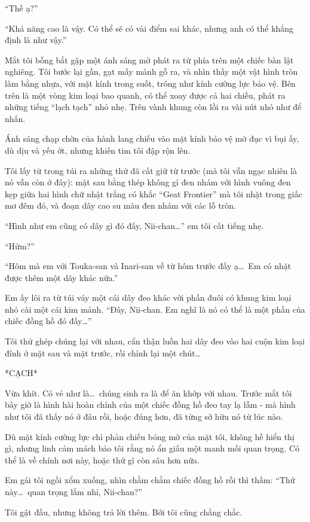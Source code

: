 \documentclass[../main.tex]{subfiles}
\begin{document}
``Thế ạ?''

``Khả năng cao là vậy. Có thể sẽ có vài điểm sai khác, nhưng anh có thể khẳng định là như vậy.''

Mắt tôi bỗng bắt gặp một ánh sáng mờ phát ra từ phía trên một chiếc bàn lật nghiêng. Tôi bước lại gần, gạt mấy mảnh gỗ ra, và nhìn thấy một vật hình tròn làm bằng nhựa, với mặt kính trong suốt, trông như kính cường lực bảo vệ. Bên trên là một vòng kim loại bao quanh, có thể xoay được cả hai chiều, phát ra những tiếng  ``lạch tạch'' nhỏ nhẹ. Trên vành khung còn lồi ra vài nút nhỏ như để nhấn.

Ánh sáng chạp chờn của hành lang chiếu vào mặt kính bảo vệ mờ đục vì bụi ấy, dù dịu và yếu ớt, nhưng khiến tim tôi đập rộn lên.

Tôi lấy từ trong túi ra những thứ đã cất giữ từ trước (mà tôi vẫn ngạc nhiên là nó vẫn còn ở đây): mặt sau bằng thép không gỉ đen nhám với hình vuông đen kẹp giữa hai hình chữ nhật trắng có khắc ``Geat Frontier'' mà tôi nhặt trong giấc mơ đêm đó, và đoạn dây cao su màu đen nhám với các lỗ tròn.

``Hình như em cũng có dây gì đó đấy, Nii-chan\dots'' em tôi cất tiếng nhẹ.

``Hửm?''

``Hôm mà em với Touka-san và Inari-san về từ hôm trước đấy ạ\dots\ Em có nhặt được thêm một dây khác nữa.''

Em ấy lôi ra từ túi váy một cái dây đeo khác với phần đuôi có khung kim loại nhỏ cài một cái kim mảnh. ``Đây, Nii-chan. Em nghĩ là nó có thể là một phần của chiếc đồng hồ đó đấy\dots''

Tôi thử ghép chúng lại với nhau, cẩn thận luồn hai dây đeo vào hai cuộn kim loại đính ở mặt sau và mặt trước, rồi chỉnh lại một chút\dots

*CẠCH*

Vừa khít. Có vẻ như là\dots\ chúng sinh ra là để ăn khớp với nhau. Trước mắt tôi bây giờ là hình hài hoàn chỉnh của một chiếc đồng hồ đeo tay lạ lẫm - mà hình như tôi đã thấy nó ở đâu rồi, hoặc đúng hơn, đã từng sở hữu nó từ lúc nào.

Dù mặt kính cường lực chỉ phản chiếu bóng mờ của mặt tôi, không hề hiển thị gì, nhưng linh cảm mách bảo tôi rằng nó ẩn giấu một manh mối quan trọng. Có thể là về chính nơi này, hoặc thứ gì còn sâu hơn nữa.

Em gái tôi ngồi xổm xuống, nhìn chằm chằm chiếc đồng hồ rồi thì thầm: ``Thứ này\dots\ quan trọng lắm nhỉ, Nii-chan?''

Tôi gật đầu, nhưng không trả lời thêm. Bởi tôi cũng chẳng chắc.
\end{document}

